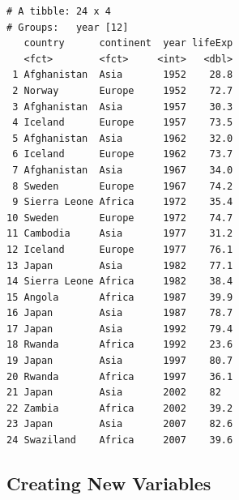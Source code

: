 \documentclass[]{krantz}
\makeatletter
\newenvironment{Shaded}{\begin{snugshade}}{\end{snugshade}}
\newcommand{\KeywordTok}[1]{\textcolor[rgb]{0.27,0.27,0.27}{\textbf{#1}}}
\newcommand{\DataTypeTok}[1]{\textcolor[rgb]{0.27,0.27,0.27}{#1}}
\newcommand{\DecValTok}[1]{\textcolor[rgb]{0.06,0.06,0.06}{#1}}
\newcommand{\StringTok}[1]{\textcolor[rgb]{0.5,0.5,0.5}{#1}}
\newcommand{\OperatorTok}[1]{\textcolor[rgb]{0.43,0.43,0.43}{\textbf{#1}}}
\newcommand{\NormalTok}[1]{#1}
\newenvironment{kframe}{%
\medskip{}
\setlength{\fboxsep}{.8em}
 \def\at@end@of@kframe{}%
 \ifinner\ifhmode%
  \def\at@end@of@kframe{\end{minipage}}%
  \begin{minipage}{\columnwidth}%
 \fi\fi%
 \def\FrameCommand##1{\hskip\@totalleftmargin \hskip-\fboxsep
 \colorbox{shadecolor}{##1}\hskip-\fboxsep
     \hskip-\linewidth \hskip-\@totalleftmargin \hskip\columnwidth}%
 \MakeFramed {\advance\hsize-\width
   \@totalleftmargin\z@ \linewidth\hsize
   \@setminipage}}%
 {\par\unskip\endMakeFramed%
 \at@end@of@kframe}
\renewenvironment{Shaded}{\begin{kframe}}{\end{kframe}}
\makeatother
\begin{document}
\begin{Shaded}
\end{Shaded}

\begin{verbatim}
# A tibble: 24 x 4
# Groups:   year [12]
   country      continent  year lifeExp
   <fct>        <fct>     <int>   <dbl>
 1 Afghanistan  Asia       1952    28.8
 2 Norway       Europe     1952    72.7
 3 Afghanistan  Asia       1957    30.3
 4 Iceland      Europe     1957    73.5
 5 Afghanistan  Asia       1962    32.0
 6 Iceland      Europe     1962    73.7
 7 Afghanistan  Asia       1967    34.0
 8 Sweden       Europe     1967    74.2
 9 Sierra Leone Africa     1972    35.4
10 Sweden       Europe     1972    74.7
11 Cambodia     Asia       1977    31.2
12 Iceland      Europe     1977    76.1
13 Japan        Asia       1982    77.1
14 Sierra Leone Africa     1982    38.4
15 Angola       Africa     1987    39.9
16 Japan        Asia       1987    78.7
17 Japan        Asia       1992    79.4
18 Rwanda       Africa     1992    23.6
19 Japan        Asia       1997    80.7
20 Rwanda       Africa     1997    36.1
21 Japan        Asia       2002    82  
22 Zambia       Africa     2002    39.2
23 Japan        Asia       2007    82.6
24 Swaziland    Africa     2007    39.6
\end{verbatim}

\subsection{Creating New Variables}\label{creating-new-variables}
\end{document}
